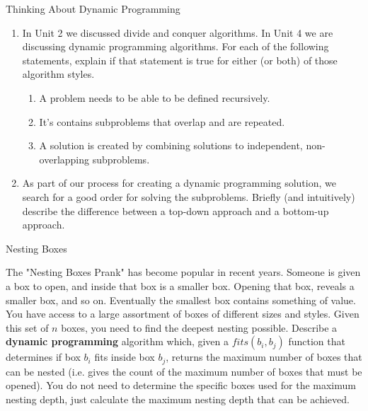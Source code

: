 \documentclass[10pt]{article}
\begin{document}
\thispagestyle{empty}
\handout


\begin{problem}Thinking About Dynamic Programming\end{problem}

\begin{enumerate}
    \item In Unit 2 we discussed divide and conquer algorithms. In Unit 4 we are discussing dynamic programming algorithms. For each of the following statements, explain if that statement is true for either (or both) of those algorithm styles. 
    \begin{enumerate}
    
    \item A problem needs to be able to be defined recursively.

    \solution{
    }
    
    \item It's contains subproblems that overlap and are repeated.
    
    \solution{
    }
    
    \item A solution is created by combining solutions to independent, non-overlapping subproblems.
    
    \solution{
    }
    
    \end{enumerate}
        
    
    \item As part of our process for creating a dynamic programming solution, we search for a good order for solving the subproblems. Briefly (and intuitively) describe the difference between a top-down approach and a bottom-up approach.  
    
    \solution{
    }

\end{enumerate}



\begin{problem}Nesting Boxes\end{problem}

The "Nesting Boxes Prank" has become popular in recent years. Someone is given a box to open, and inside that box is a smaller box. Opening that box, reveals a smaller box, and so on. Eventually the smallest box contains something of value. You have access to a large assortment of boxes of different sizes and styles. Given this set of $n$ boxes, you need to find the deepest nesting possible. Describe a \textbf{dynamic programming} algorithm which, given a $fits(b_i,b_j)$ function that determines if box $b_i$ fits inside box $b_j$, returns the maximum number of boxes that can be nested (i.e. gives the count of the maximum number of boxes that must be opened). You do not need to determine the specific boxes used for the maximum nesting depth, just calculate the maximum nesting depth that can be achieved.
\end{document}
